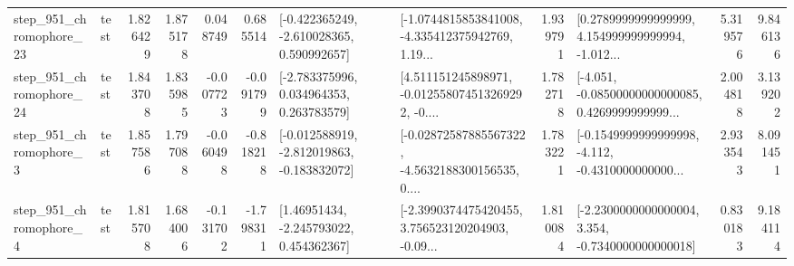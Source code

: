 \begin{tabular}{llrrrrllrlrr}
  step\_951\_chromophore\_23 &      test &      1.826429 &    1.875178 &      0.048749 &  0.685514 &   [-0.422365249, -2.610028365, 0.590992657] &  [-1.0744815853841008, -4.335412375942769, 1.19... &       1.939791 &  [0.2789999999999999, 4.154999999999994, -1.012... &            5.319576 &          9.846136 \\
  step\_951\_chromophore\_24 &      test &      1.843708 &    1.835985 &     -0.007723 & -0.091799 &    [-2.783375996, 0.034964353, 0.263783579] &  [4.511151245898971, -0.012558074513269292, -0.... &       1.782718 &  [-4.051, -0.08500000000000085, 0.4269999999999... &            2.004818 &          3.139202 \\
   step\_951\_chromophore\_3 &      test &      1.857586 &    1.797088 &     -0.060498 & -0.818218 &  [-0.012588919, -2.812019863, -0.183832072] &  [-0.02872587885567322, -4.5632188300156535, 0.... &       1.783221 &  [-0.1549999999999998, -4.112, -0.4310000000000... &            2.933543 &          8.091451 \\
   step\_951\_chromophore\_4 &      test &      1.815708 &    1.684006 &     -0.131702 & -1.798311 &     [1.46951434, -2.245793022, 0.454362367] &  [-2.3990374475420455, 3.756523120204903, -0.09... &       1.810084 &  [-2.2300000000000004, 3.354, -0.7340000000000018] &            0.830183 &          9.184114 \\
\bottomrule
\end{tabular}

